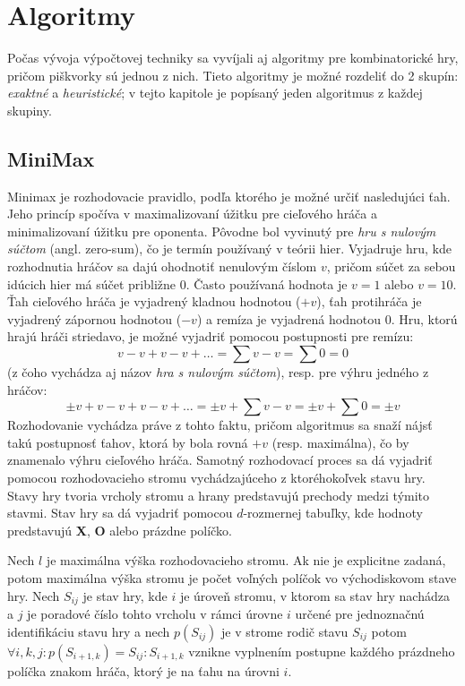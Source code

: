 \section{Algoritmy}\label{sec:algorithms}

Počas vývoja výpočtovej techniky sa vyvíjali aj algoritmy pre kombinatorické hry, pričom piškvorky sú jednou z nich.
Tieto algoritmy je možné rozdeliť do 2 skupín: \emph{exaktné} a \emph{heuristické}; v tejto kapitole je popísaný jeden
algoritmus z každej skupiny.

\subsection{MiniMax}\label{subsec:algo-minmax}

Minimax je rozhodovacie pravidlo, podľa ktorého je možné určiť nasledujúci ťah.
Jeho princíp spočíva v maximalizovaní úžitku pre cieľového hráča a minimalizovaní úžitku pre oponenta.
Pôvodne bol vyvinutý pre \emph{hru s nulovým súčtom} (angl. zero-sum), čo je termín používaný v teórii hier.
Vyjadruje hru, kde rozhodnutia hráčov sa dajú ohodnotiť nenulovým číslom $v$, pričom súčet za sebou idúcich hier má
súčet približne 0.
Často používaná hodnota je $v=1$ alebo $v=10$.
Ťah cieľového hráča je vyjadrený kladnou hodnotou ($+v$), ťah protihráča je vyjadrený zápornou hodnotou ($-v$) a remíza
je vyjadrená hodnotou $0$.
Hru, ktorú hrajú hráči striedavo, je možné vyjadriť pomocou postupnosti pre remízu:
\begin{equation}
    v-v+v-v+ \dots = \sum{v-v} = \sum{0} = 0
\end{equation}
(z čoho vychádza aj názov \emph{hra s nulovým súčtom}), resp. pre výhru jedného z hráčov:
\begin{equation}
    \pm v+v-v+v-v+ \dots = \pm v+\sum{v-v} = \pm v+\sum{0} = \pm v
\end{equation}
Rozhodovanie vychádza práve z tohto faktu, pričom algoritmus sa snaží nájsť takú postupnosť ťahov, ktorá by bola rovná
$+v$ (resp. maximálna), čo by znamenalo výhru cieľového hráča.
Samotný rozhodovací proces sa dá vyjadriť pomocou rozhodovacieho stromu vychádzajúceho z ktoréhokoľvek stavu hry.
Stavy hry tvoria vrcholy stromu a hrany predstavujú prechody medzi týmito stavmi.
Stav hry sa dá vyjadriť pomocou $d$-rozmernej tabuľky, kde hodnoty predstavujú \textbf{X}, \textbf{O} alebo prázdne
políčko.

Nech $l$ je maximálna výška rozhodovacieho stromu.
Ak nie je explicitne zadaná, potom maximálna výška stromu je počet voľných políčok vo východiskovom stave hry.
Nech $S_{ij}$ je stav hry, kde $i$ je úroveň stromu, v ktorom sa stav hry nachádza a $j$ je poradové číslo tohto vrcholu
v rámci úrovne $i$ určené pre jednoznačnú identifikáciu stavu hry a nech $p(S_{ij})$ je v strome rodič stavu $S_{ij}$
potom $\forall i, k, j \colon p(S_{i+1,k}) = S_{ij} \colon S_{i+1,k}$ vznikne vyplnením postupne každého
prázdneho políčka znakom hráča, ktorý je na ťahu na úrovni $i$.

